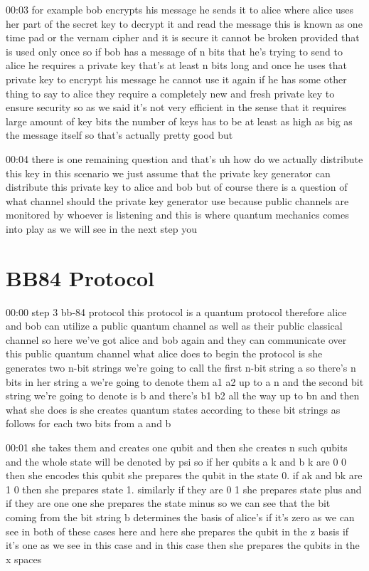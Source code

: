 00:03
for example bob encrypts his message he sends it to alice
where alice uses her part of the secret key to decrypt it and read the message
this is known as one time pad or the vernam cipher
and it is secure it cannot be broken provided that is used only once so
if bob has a message of n bits that he's trying to send to alice
he requires a private key that's at least n bits long
and once he uses that private key to encrypt his message
he cannot use it again if he has some other thing to say to alice
they require a completely new and fresh private key to ensure security
so as we said it's not very efficient in the sense that it
requires large amount of key bits the number of keys has to be at least as
high as big as the message itself so that's actually pretty good but

00:04
there is one remaining question and that's uh
how do we actually distribute this key in this scenario we just assume
that the private key generator can distribute this private key to alice and bob
but of course there is a question of what channel should the private key
generator use because public channels are monitored by
whoever is listening and this is where quantum mechanics comes into
play as we will see in the next step you

\section{BB84 Protocol}


00:00
step 3 bb-84 protocol this protocol is a quantum protocol
therefore alice and bob can utilize a public quantum channel as well
as their public classical channel so here we've got alice and bob again
and they can communicate over this public quantum channel what alice does
to begin the protocol is she generates two n-bit strings
we're going to call the first n-bit string a
so there's n bits in her string a we're going to denote them a1
a2 up to a n and the second bit string we're going to denote is b and there's
b1 b2 all the way up to bn and then what she does is she creates quantum states
according to these bit strings as follows for each two bits from a and b

00:01
she takes them and creates one qubit and then she creates n such qubits and
the whole state will be denoted by psi so if her qubits a k and b k are 0 0 then
she encodes this qubit she prepares the qubit in the state 0.
if ak and bk are 1 0 then she prepares state 1. similarly if they are 0 1
she prepares state plus and if they are one one she prepares the state minus
so we can see that the bit coming from the bit string b determines the basis of
alice's if it's zero as we can see in both of these cases here and here she
prepares the qubit in the z basis if it's one as we see in this case and in this
case then she prepares the qubits in the x spaces

